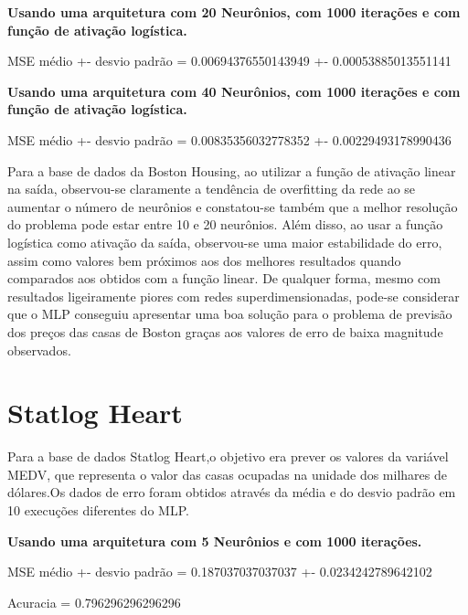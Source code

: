 \documentclass{article}
\begin{document}
\textbf{Usando uma arquitetura com 20 Neurônios, com 1000 iterações e com função de ativação logística.}

\begin{Schunk}
\begin{Soutput}
MSE médio +- desvio padrão = 0.00694376550143949 +- 0.00053885013551141
\end{Soutput}
\end{Schunk}


\textbf{Usando uma arquitetura com 40 Neurônios, com 1000 iterações e com função de ativação logística.}

\begin{Schunk}
\begin{Soutput}
MSE médio +- desvio padrão = 0.00835356032778352 +- 0.00229493178990436
\end{Soutput}
\end{Schunk}

Para a base de dados da Boston Housing, ao utilizar a função de ativação linear na saída, observou-se claramente a tendência de overfitting da rede ao se aumentar o número de neurônios e constatou-se também que a melhor resolução do problema pode estar entre 10 e 20 neurônios. Além disso, ao usar a função logística como ativação da saída, observou-se uma maior estabilidade do erro, assim como valores bem próximos aos dos melhores resultados quando comparados aos obtidos com a função linear. De qualquer forma, mesmo com resultados ligeiramente piores com redes superdimensionadas, pode-se considerar que o MLP conseguiu apresentar uma boa solução para o problema de previsão dos preços das casas de Boston graças aos valores de erro de baixa magnitude observados. 


\section{Statlog Heart}

Para a base de dados Statlog Heart,o objetivo era prever os valores da variável MEDV, que representa o valor das casas ocupadas na unidade dos milhares de dólares.Os dados de erro foram obtidos através da média e do desvio padrão em 10 execuções diferentes do MLP. 


\textbf{Usando uma arquitetura com 5 Neurônios e com 1000 iterações.}

\begin{Schunk}
\begin{Soutput}
MSE médio +- desvio padrão = 0.187037037037037 +- 0.0234242789642102
\end{Soutput}
\begin{Soutput}
Acuracia = 0.796296296296296
\end{Soutput}
\end{Schunk}
\end{document}
